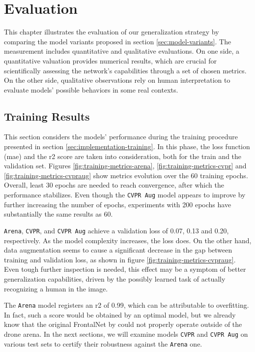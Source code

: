 \chapter{Evaluation}
\label{chap:evaluation}


This chapter illustrates the evaluation of our generalization strategy by comparing the model variants proposed in section \ref{sec:model-variants}. The measurement includes quantitative and qualitative evaluations. On one side, a quantitative valuation provides numerical results, which are crucial for scientifically assessing the network's capabilities through a set of chosen metrics. On the other side, qualitative observations rely on human interpretation to evaluate models' possible behaviors in some real contexts.



\section{Training Results}
\label{sec:evaluation-training}

This section considers the models' performance during the training procedure presented in section \ref{sec:implementation-training}. In this phase, the loss function (\gls{mae}) and the \gls{r2} score are taken into consideration, both for the train and the validation set. Figures \ref{fig:training-metrics-arena}, \ref{fig:training-metrics-cvpr} and \ref{fig:training-metrics-cvpraug} show metrics evolution over the 60 training epochs. Overall, least 30 epochs are needed to reach convergence, after which the performance stabilizes. Even though the \texttt{CVPR Aug} model appears to improve by further increasing the number of epochs, experiments with 200 epochs have substantially the same results as 60.

\texttt{Arena}, \texttt{CVPR}, and \texttt{CVPR Aug} achieve a validation loss of 0.07, 0.13 and 0.20, respectively. As the model complexity increases, the loss does. On the other hand, data augmentation seems to cause a significant decrease in the gap between training and validation loss, as shown in figure \ref{fig:training-metrics-cvpraug}. Even tough further inspection is needed, this effect may be a symptom of better generalization capabilities, driven by the possibly learned task of actually recognizing a human in the image. 

The \texttt{Arena} model registers an \gls{r2} of 0.99, which can be attributable to overfitting. In fact, such a score would be obtained by an optimal model, but we already know that the original FrontalNet by \cite{mantegazza2019visionbased} could not properly operate outside of the drone arena. In the next sections, we will examine models \texttt{CVPR} and \texttt{CVPR Aug} on various test sets to certify their robustness against the \texttt{Arena} one.

